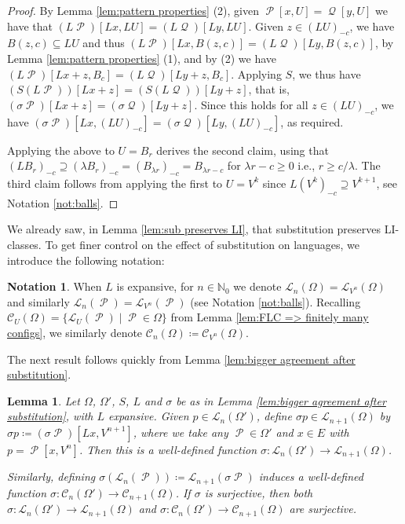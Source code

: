 \documentclass[11pt]{amsart}
\numberwithin{equation}{section}
\theoremstyle{plain}
\newtheorem{lemma}[theorem]{Lemma}
\theoremstyle{definition}
\newtheorem{notation}[theorem]{Notation}
\newcommand{\N}{\mathbb N}
\newcommand{\sub}{\sigma}
\DeclareMathOperator{\cP}{\mathcal{P}}
\DeclareMathOperator{\cQ}{\mathcal{Q}}
\newcommand{\lang}{\mathscr{L}}
\begin{document}
\begin{proof}
By Lemma \ref{lem:pattern properties} (2), given \(\cP[x,U] = \cQ[y,U]\) we have that \((L\cP)[Lx,LU] = (L\cQ)[Ly,LU]\). Given \(z \in (LU)_{-c}\), we have \(B(z,c) \subseteq LU\) and thus \((L\cP)[Lx,B(z,c)] = (L\cQ)[Ly,B(z,c)]\), by Lemma \ref{lem:pattern properties} (1), and by (2) we have \((L \cP)[Lx + z,B_c] = (L \cQ)[Ly + z,B_c]\). Applying \(S\), we thus have \((S(L \cP))[Lx+z] = (S(L \cQ))[Ly+z]\), that is, \((\sub \cP)[Lx+z] = (\sub \cQ)[Ly+z]\). Since this holds for all \(z \in (LU)_{-c}\), we have \((\sub \cP)[Lx,(LU)_{-c}] = (\sub \cQ)[Ly,(LU)_{-c}]\), as required.

Applying the above to \(U = B_r\) derives the second claim, using that \((LB_r)_{-c} \supseteq (\lambda B_r)_{-c} = (B_{\lambda r})_{-c} = B_{\lambda r - c}\) for \(\lambda r - c \geq 0\) i.e., \(r \geq c/\lambda\). The third claim follows from applying the first to \(U = V^k\) since \(L(V^k)_{-c} \supseteq V^{k+1}\), see Notation \ref{not:balls}.
\end{proof}

We already saw, in Lemma \ref{lem:sub preserves LI}, that substitution preserves LI-classes. To get finer control on the effect of substitution on languages, we introduce the following notation:

\begin{notation}\label{not:language levels}
When \(L\) is expansive, for \(n \in \N_0\) we denote \(\lang_n(\Omega) = \lang_{V^n}(\Omega)\) and similarly \(\lang_n(\cP) = \lang_{V^n}(\cP)\) (see Notation \ref{not:balls}). Recalling \(\mathscr{C}_U(\Omega) = \{\lang_U(\cP) \mid \cP \in \Omega\}\) from Lemma \ref{lem:FLC => finitely many configs}, we similarly denote \(\mathscr{C}_n(\Omega) \coloneqq \mathscr{C}_{V^n}(\Omega)\).
\end{notation}

The next result follows quickly from Lemma \ref{lem:bigger agreement after substitution}.

\begin{lemma}\label{lem:induced substitution on patches}
Let \(\Omega\), \(\Omega'\), \(S\), \(L\) and \(\sub\) be as in Lemma \ref{lem:bigger agreement after substitution}, with \(L\) expansive. Given \(p \in \lang_n(\Omega')\), define \(\sub p \in \lang_{n+1}(\Omega)\) by \(\sub p \coloneqq (\sub \cP)[Lx,V^{n+1}]\), where we take any \(\cP \in \Omega'\) and \(x \in E\) with \(p = \cP[x,V^n]\). Then this is a well-defined function \(\sub \colon \lang_n(\Omega') \to \lang_{n+1}(\Omega)\).

Similarly, defining \(\sub(\lang_n(\cP)) \coloneqq \lang_{n+1}(\sub \cP)\) induces a well-defined function \(\sub \colon \mathscr{C}_n(\Omega') \to \mathscr{C}_{n+1}(\Omega)\). If \(\sub\) is surjective, then both \(\sub \colon \lang_n(\Omega') \to \lang_{n+1}(\Omega)\) and \(\sub \colon \mathscr{C}_n(\Omega') \to \mathscr{C}_{n+1}(\Omega)\) are surjective.
\end{lemma}
\end{document}
